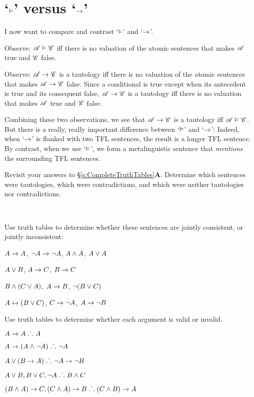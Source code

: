 \section{`$\vDash$' versus `$\rightarrow$'}
I now want to compare and contrast `$\vDash$' and `$\rightarrow$'. 

Observe: $\mathscr{A} \vDash \mathscr{C}$ iff there is no valuation of the atomic sentences that makes $\mathscr{A}$ true and $\mathscr{C}$ false. 

Observe: $\mathscr{A} \rightarrow \mathscr{C}$ is a tautology iff there is no valuation of the atomic sentences that makes $\mathscr{A} \rightarrow \mathscr{C}$ false. Since a conditional is true except when its antecedent is true and its consequent false, $\mathscr{A} \rightarrow \mathscr{C}$ is a tautology iff there is no valuation that makes $\mathscr{A}$ true and $\mathscr{C}$ false. 

Combining these two observations, we see that $\mathscr{A} \rightarrow \mathscr{C}$  is a tautology iff  $\mathscr{A} \vDash \mathscr{C}$. But there is a really, really important difference between `$\vDash$' and `$\rightarrow$':
Indeed, when `$\rightarrow$' is flanked with two TFL sentences, the result is a longer TFL sentence. By contrast, when we use `$\vDash$', we form a metalinguistic sentence that \emph{mentions} the surrounding TFL sentences. 


\practiceproblems
\problempart
Revisit your answers to \S\ref{s:CompleteTruthTables}\textbf{A}. Determine which sentences were tautologies, which were contradictions, and which were neither tautologies nor contradictions.

\

\problempart
Use truth tables to determine whether these sentences are jointly consistent, or jointly inconsistent:
\begin{earg}
\item $A\rightarrow A$, $\neg A \rightarrow \neg A$, $A\wedge A$, $A\vee A$ %
\item $A\vee B$, $A\rightarrow C$, $B\rightarrow C$ %
\item $B\wedge(C\vee A)$, $A\rightarrow B$, $\neg(B\vee C)$  %
\item $A\leftrightarrow(B\vee C)$, $C\rightarrow \neg A$, $A\rightarrow \neg B$ %
\end{earg}

\problempart
Use truth tables to determine whether each argument is valid or invalid.
\begin{earg}
\item $A\rightarrow A \mathrel{\ldotp\dot{}\,\ldotp} A$ %
\item $A\rightarrow(A\wedge\neg A) \mathrel{\ldotp\dot{}\,\ldotp} \neg A$ %
\item $A\vee(B\rightarrow A) \mathrel{\ldotp\dot{}\,\ldotp} \neg A \rightarrow \neg B$ %
\item $A\vee B, B\vee C, \neg A \mathrel{\ldotp\dot{}\,\ldotp} B \wedge C$ %
\item $(B\wedge A)\rightarrow C, (C\wedge A)\rightarrow B \mathrel{\ldotp\dot{}\,\ldotp} (C\wedge B)\rightarrow A$ %
\end{earg}

